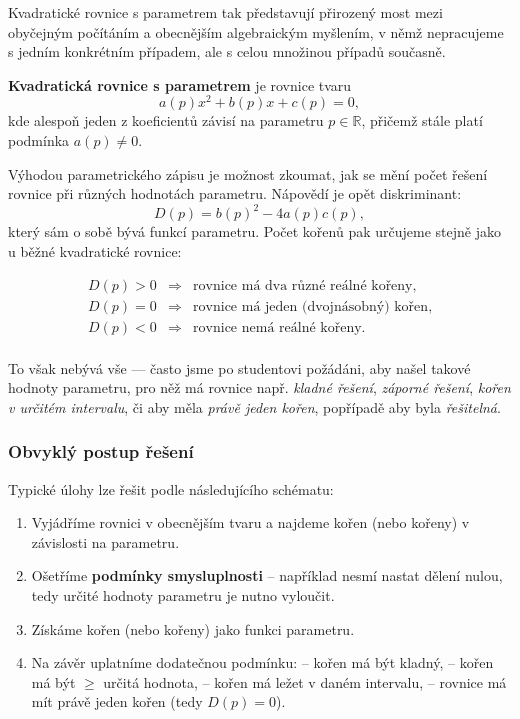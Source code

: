 \documentclass[12pt,a4paper]{article}
\begin{document}
Kvadratické rovnice s parametrem tak představují přirozený most mezi obyčejným počítáním a 
obecnějším algebraickým myšlením, v němž nepracujeme s jedním konkrétním případem, 
ale s celou množinou případů současně.

\begin{definitionbox}
\textbf{Kvadratická rovnice s parametrem} je rovnice tvaru
\[
a(p)x^2 + b(p)x + c(p) = 0,
\]
kde alespoň jeden z koeficientů závisí na parametru \(p \in \mathbb{R}\), 
přičemž stále platí podmínka \(a(p) \neq 0\).
\end{definitionbox}

Výhodou parametrického zápisu je možnost zkoumat, 
jak se mění počet řešení rovnice při různých hodnotách parametru.  
Nápovědí je opět diskriminant:
\[
D(p) = b(p)^2 - 4a(p)c(p),
\]
který sám o sobě bývá funkcí parametru.  
Počet kořenů pak určujeme stejně jako u běžné kvadratické rovnice:

\[
\begin{array}{lll}
D(p) > 0 & \Rightarrow & \text{rovnice má dva různé reálné kořeny},\\[4pt]
D(p) = 0 & \Rightarrow & \text{rovnice má jeden (dvojnásobný) kořen},\\[4pt]
D(p) < 0 & \Rightarrow & \text{rovnice nemá reálné kořeny}.\\
\end{array}
\]

To však nebývá vše — často jsme po studentovi požádáni, 
aby našel takové hodnoty parametru, 
pro něž má rovnice např. \textit{kladné řešení}, \textit{záporné řešení}, 
\textit{kořen v určitém intervalu}, 
či aby měla \textit{právě jeden kořen}, popřípadě aby byla \textit{řešitelná}.

\subsubsection*{Obvyklý postup řešení}
Typické úlohy lze řešit podle následujícího schématu:

\begin{enumerate}[label=\arabic*.]
  \item Vyjádříme rovnici v obecnějším tvaru a najdeme kořen (nebo kořeny) v závislosti na parametru.
  \item Ošetříme \textbf{podmínky smysluplnosti} – například nesmí nastat dělení nulou, tedy určité hodnoty parametru je nutno vyloučit.
  \item Získáme kořen (nebo kořeny) jako funkci parametru.
  \item Na závěr uplatníme dodatečnou podmínku:  
    – kořen má být kladný,  
    – kořen má být $\ge$ určitá hodnota,  
    – kořen má ležet v daném intervalu,  
    – rovnice má mít právě jeden kořen (tedy \(D(p)=0\)).
\end{enumerate}
\end{document}
